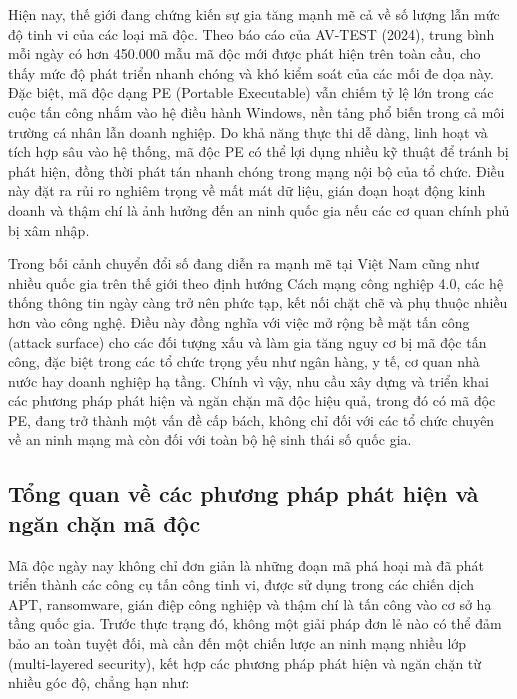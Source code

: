 Hiện nay, thế giới đang chứng kiến sự gia tăng mạnh mẽ cả về số
lượng lẫn mức độ tinh vi của các loại mã độc. Theo báo cáo của
AV-TEST (2024), \cite{avtestmalwarestats} trung bình mỗi ngày có hơn 450.000 mẫu mã độc
mới được phát hiện trên toàn cầu, cho thấy mức độ phát triển
nhanh chóng và khó kiểm soát của các mối đe dọa này. Đặc biệt,
mã độc dạng PE (Portable Executable) vẫn chiếm tỷ lệ lớn trong
các cuộc tấn công nhắm vào hệ điều hành Windows, nền tảng phổ
biến trong cả môi trường cá nhân lẫn doanh nghiệp. Do khả năng
thực thi dễ dàng, linh hoạt và tích hợp sâu vào hệ thống, mã
độc PE có thể lợi dụng nhiều kỹ thuật để tránh bị phát hiện,
đồng thời phát tán nhanh chóng trong mạng nội bộ của tổ chức.
Điều này đặt ra rủi ro nghiêm trọng về mất mát dữ liệu, gián
đoạn hoạt động kinh doanh và thậm chí là ảnh hưởng đến an ninh
quốc gia nếu các cơ quan chính phủ bị xâm nhập.

Trong bối cảnh chuyển đổi số đang diễn ra mạnh mẽ tại Việt Nam
cũng như nhiều quốc gia trên thế giới theo định hướng Cách mạng
công nghiệp 4.0, các hệ thống thông tin ngày càng trở nên phức
tạp, kết nối chặt chẽ và phụ thuộc nhiều hơn vào công nghệ.
Điều này đồng nghĩa với việc mở rộng bề mặt tấn công (attack
surface) cho các đối tượng xấu và làm gia tăng nguy cơ bị mã độc
tấn công, đặc biệt trong các tổ chức trọng yếu như ngân hàng,
y tế, cơ quan nhà nước hay doanh nghiệp hạ tầng. Chính vì vậy,
nhu cầu xây dựng và triển khai các phương pháp phát hiện và
ngăn chặn mã độc hiệu quả, trong đó có mã độc PE, đang trở
thành một vấn đề cấp bách, không chỉ đối với các tổ chức
chuyên về an ninh mạng mà còn đối với toàn bộ hệ sinh thái
số quốc gia.













\subsection{Tổng quan về các phương pháp phát hiện và ngăn chặn mã độc}

Mã độc ngày nay không chỉ đơn giản là những đoạn mã phá hoại mà
đã phát triển thành các công cụ tấn công tinh vi, được sử dụng
trong các chiến dịch APT, ransomware, gián điệp công nghiệp và
thậm chí là tấn công vào cơ sở hạ tầng quốc gia. Trước thực trạng
đó, không một giải pháp đơn lẻ nào có thể đảm bảo an toàn tuyệt
đối, mà cần đến một chiến lược an ninh mạng nhiều lớp
(multi-layered security), kết hợp các phương pháp phát hiện và
ngăn chặn từ nhiều góc độ, chẳng hạn như:

